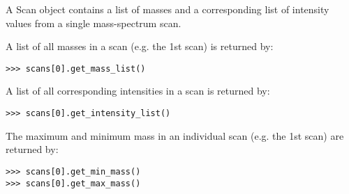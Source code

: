 
A Scan object contains a list of masses and a corresponding list of intensity
values from a single mass-spectrum scan.

A list of all masses in a scan (e.g. the 1st scan) is returned by:

\begin{verbatim}
>>> scans[0].get_mass_list()
\end{verbatim}

A list of all corresponding intensities in a scan is returned by:

\begin{verbatim}
>>> scans[0].get_intensity_list()
\end{verbatim}

The maximum and minimum mass in an individual scan (e.g. the 1st scan) are
returned by:

\begin{verbatim}
>>> scans[0].get_min_mass()
>>> scans[0].get_max_mass()
\end{verbatim}

